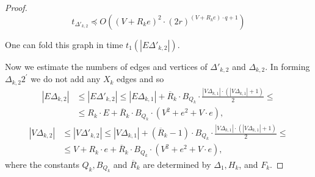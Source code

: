 \documentclass[a4paper,12pt]{article}
\newcommand{\D}{\Delta }
\newcommand{\T}{\Theta }
\numberwithin{equation}{section}
\numberwithin{figure}{section}
\begin{document}
\begin{proof}
\begin{equation}\label{theta'2}
t_{\D'_{k,2}} \preceq O((V + R_k e)^2\cdot (2r)^{(V +
R_k e)\cdot q +1})
\end{equation}

One can fold this graph in time $t_1(|E\D'_{k,2}|)$.

Now we estimate the numbers of edges  and vertices  of $\D'_{k,2}$ and
$\D_{k,2}$. In forming $\D_{k,2}2^\prime$  we do not add any $X_k$ edges
and so
\begin{equation}\label{etheta2}
\begin{split}
|E\D_{k,2}| &\le |E\D'_{k,2}| \le |E\D_{k,1}|+\overline{R}_k\cdot B_{Q_k}
\cdot \frac{|V\D_{k,1}|\cdot(|V\D_{k,1}|+1)}{2}\le\\
&\le R_k \cdot E +
\overline{R}_k\cdot B_{Q_k} \cdot (V^2 + e^2+V\cdot e),
\end{split}
\end{equation}
\begin{equation}\label{vtheta2}
\begin{split}
|V\D_{k,2}| &\le |V \D'_{k,2}| \le |V\D_{k,1}|+(\overline{R}_k-1)\cdot B_{Q_k}
\cdot \frac{|V\D_{k,1}|\cdot(|V\D_{k,1}|+1)}{2}\le\\ &\le V + R_k \cdot e +
\overline{R}_k \cdot B_{Q_k}\cdot (V^2 + e^2+V\cdot e),
\end{split}
\end{equation}
where the constants $Q_k, B_{Q_k}$ and  $\overline{R}_k$ are determined  by $\D_1,
H_k$, and $F_k$.



\end{proof}
\end{document}
